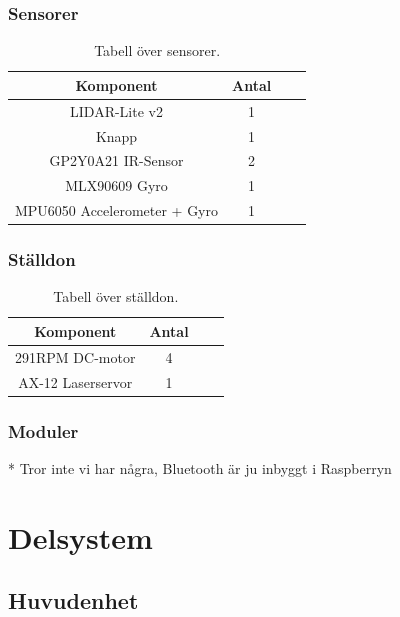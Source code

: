 \documentclass{article}
\begin{document}
\subsubsection{Sensorer}
\begin{table}[H]
  \centering
  \begin{tabular}{ | c | c | c | c |}
    \hline
    \textbf{Komponent} & \textbf{Antal} \\
    \hline
    LIDAR-Lite v2 & 1 \\
    \hline
    Knapp & 1 \\
    \hline
    GP2Y0A21 IR-Sensor & 2 \\
    \hline
    MLX90609 Gyro & 1 \\
    \hline
    MPU6050 Accelerometer + Gyro & 1 \\
    \hline
  \end{tabular}
  \caption{ Tabell över sensorer. }
\end{table}

\subsubsection{Ställdon}
\begin{table}[H]
  \centering
  \begin{tabular}{ | c | c | c | c |}
    \hline
    \textbf{Komponent} & \textbf{Antal} \\
    \hline
    291RPM DC-motor & 4 \\
    \hline
    AX-12 Laserservor & 1 \\
    \hline
  \end{tabular}
  \caption{ Tabell över ställdon. }
\end{table}

\subsubsection{Moduler}
* Tror inte vi har några, Bluetooth är ju inbyggt i Raspberryn

\clearpage

\section{Delsystem}

\subsection{Huvudenhet}
\end{document}
